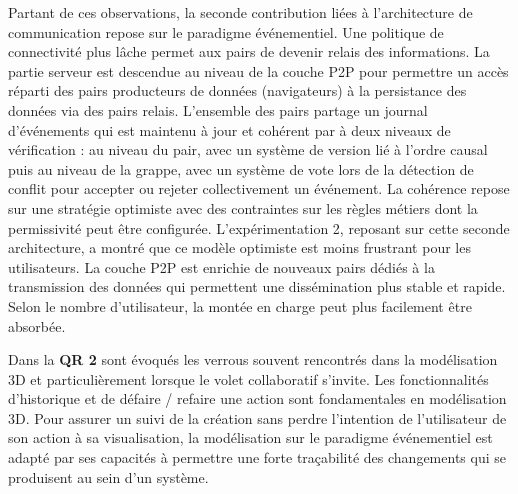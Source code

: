 Partant de ces observations, la seconde contribution liées à l'architecture de 
communication repose sur le paradigme événementiel. Une politique de 
connectivité plus lâche permet aux pairs de devenir relais des informations. La 
partie serveur est \og descendue\fg{} au niveau de la couche \gls{P2P} pour 
permettre un accès réparti des pairs producteurs de données (navigateurs) à la
persistance des données via des pairs relais. L'ensemble des pairs partage un 
journal d'événements qui est maintenu à jour et cohérent par à deux niveaux de 
vérification : au niveau du pair, avec un système de version lié à l'ordre causal 
puis au niveau de la grappe, avec un système de vote lors de la détection de 
conflit pour accepter ou rejeter collectivement un événement. La cohérence repose 
sur une stratégie optimiste avec des contraintes sur les règles métiers dont la 
permissivité peut être configurée.
L'expérimentation 2, reposant sur cette seconde architecture, a montré que ce 
modèle optimiste est moins frustrant pour les utilisateurs. La couche \gls{P2P} est 
enrichie de nouveaux pairs dédiés à la transmission des données qui permettent 
une dissémination plus stable et rapide. Selon le nombre d'utilisateur, la montée 
en charge peut plus facilement être absorbée.



Dans la \textbf{QR 2} sont évoqués les verrous souvent rencontrés dans la 
modélisation 3D et particulièrement lorsque le volet collaboratif s'invite. Les 
fonctionnalités d'historique et de défaire / refaire une action sont fondamentales en 
modélisation 3D. Pour assurer un suivi de la création sans perdre l'intention de 
l'utilisateur de son action à sa visualisation, la modélisation sur le paradigme 
événementiel est adapté par ses capacités à permettre une forte traçabilité des 
changements qui se produisent au sein d'un système. 


